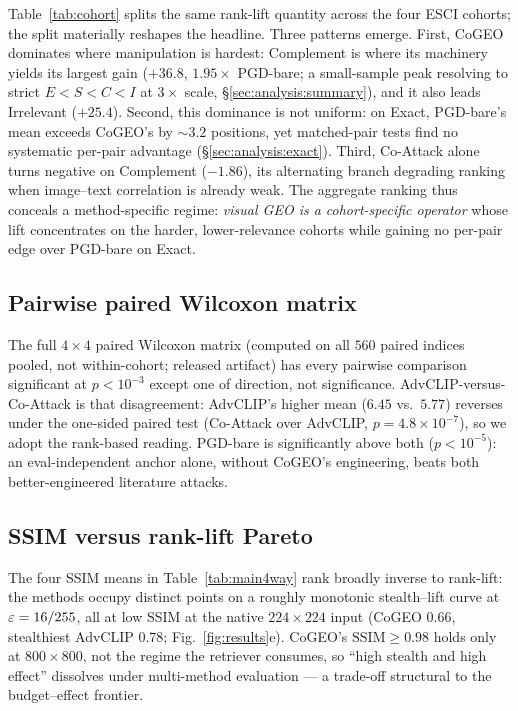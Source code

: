Table~\ref{tab:cohort} splits the same rank-lift quantity across the four ESCI cohorts; the split materially reshapes the headline. Three patterns emerge. First, CoGEO dominates where manipulation is hardest: Complement is where its machinery yields its largest gain ($+36.8$, $1.95\times$ PGD-bare; a small-sample peak resolving to strict $E\!<\!S\!<\!C\!<\!I$ at $3\times$ scale, \S\ref{sec:analysis:summary}), and it also leads Irrelevant ($+25.4$). Second, this dominance is not uniform: on Exact, PGD-bare's mean exceeds CoGEO's by $\sim3.2$ positions, yet matched-pair tests find no systematic per-pair advantage (\S\ref{sec:analysis:exact}). Third, Co-Attack alone turns negative on Complement ($-1.86$), its alternating branch degrading ranking when image--text correlation is already weak. The aggregate ranking thus conceals a method-specific regime: \emph{visual GEO is a cohort-specific operator} whose lift concentrates on the harder, lower-relevance cohorts while gaining no per-pair edge over PGD-bare on Exact.

\subsection{Pairwise paired Wilcoxon matrix}
\label{sec:analysis:wilcoxon}

The full $4 \times 4$ paired Wilcoxon matrix (computed on all $560$ paired indices pooled, not within-cohort; released artifact) has every pairwise comparison significant at $p < 10^{-3}$ except one of direction, not significance. AdvCLIP-versus-Co-Attack is that disagreement: AdvCLIP's higher mean ($6.45$ vs.\ $5.77$) reverses under the one-sided paired test (Co-Attack over AdvCLIP, $p{=}4.8{\times}10^{-7}$), so we adopt the rank-based reading. PGD-bare is significantly above both ($p < 10^{-5}$): an eval-independent anchor alone, without CoGEO's engineering, beats both better-engineered literature attacks.

\subsection{SSIM versus rank-lift Pareto}
\label{sec:analysis:ssim}

The four SSIM means in Table~\ref{tab:main4way} rank broadly inverse to rank-lift: the methods occupy distinct points on a roughly monotonic stealth--lift curve at $\varepsilon = 16/255$, all at low SSIM at the native $224 \times 224$ input (CoGEO $0.66$, stealthiest AdvCLIP $0.78$; Fig.~\ref{fig:results}e). CoGEO's $\mathrm{SSIM} \geq 0.98$ holds only at $800 \times 800$, not the regime the retriever consumes, so ``high stealth and high effect'' dissolves under multi-method evaluation --- a trade-off structural to the budget--effect frontier.

